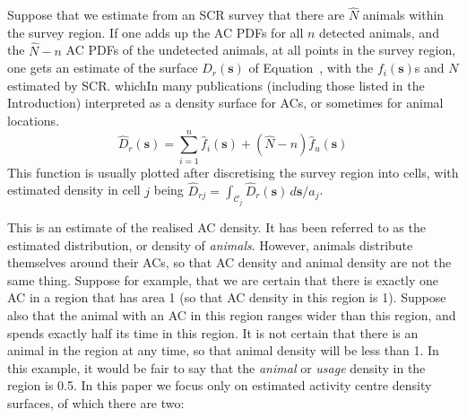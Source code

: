 \documentclass[useAMS,usenatbib,referee]{biom}
\begin{document}
Suppose that we estimate from an SCR survey that there are $\hat{N}$ animals within the survey region. If one adds up the AC PDFs for all $n$ detected animals, and the $\hat{N}-n$ AC PDFs of the undetected animals, at all points in the survey region, one gets an estimate of the surface $D_r(\bm{s})$ of Equation~\label{eq:realised-D}, with the $f_i(\bm{s})$s and $N$ estimated by SCR.  whichIn many publications (including those listed in the Introduction) interpreted as a density surface for ACs, or sometimes for animal locations. %
\begin{equation}
\widehat{D}_r(\bm{s}) = \sum_{i = 1}^n \hat{f}_i(\bm{s}) + (\widehat{N} - n)\hat{f}_u(\bm{s})
\end{equation}
This function is usually plotted after discretising the survey region into cells, with estimated density in cell $j$ being $\widehat{D}_{rj}=\int_{\mathcal{C}_j}\widehat{D}_r(\bm{s})\, d\bm{s}/a_j$.

This is an estimate of the realised AC density. It has been referred to as the estimated distribution, or density of \textit{animals}. However, animals distribute themselves around their ACs, so that AC density and animal density are not the same thing. Suppose for example, that we are certain that there is exactly one AC in a region that has area 1 (so that AC density in this region is 1). Suppose also that the animal with an AC in this region ranges wider than this region, and spends exactly half its time in this region. It is not certain that there is an animal in the region at any time, so that animal density will be less than 1. In this example, it would be fair to say that the \textit{animal} or \textit{usage} density in the region is 0.5. In this paper we focus only on estimated activity centre density surfaces, of which there are two:
\end{document}
